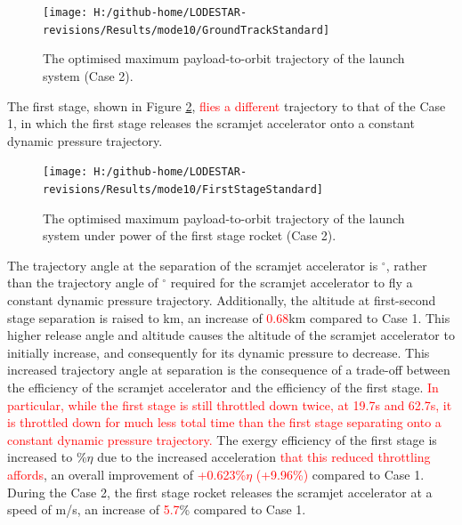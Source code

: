 \begin{figure}[ht!]%
	
	
	
	\centering
	\texttt{[image: H:/github-home/LODESTAR-revisions/Results/mode10/GroundTrackStandard]}
	\caption{The optimised maximum payload-to-orbit trajectory of the launch system (Case 2).}
	\label{fig:GroundTrackStandardNoReturn}
\end{figure}


The first stage, shown in Figure \ref{fig:FirstStageStandardNoReturn}, \textcolor{red}{flies a different} trajectory to that of the Case 1, in which the first stage releases the scramjet accelerator onto a constant dynamic pressure trajectory.
\begin{figure}[ht!]%
	\centering
	\texttt{[image: H:/github-home/LODESTAR-revisions/Results/mode10/FirstStageStandard]}
	\caption{The optimised maximum payload-to-orbit trajectory of the launch system under power of the first stage rocket (Case 2).}
	\label{fig:FirstStageStandardNoReturn}
\end{figure}
 The trajectory angle at the separation of the scramjet accelerator is \secondthirdSeparationgammaqStandardNoReturn$^\circ$, rather than the trajectory angle of \secondthirdSeparationgammaConstqNoReturn$^\circ$ required for the scramjet accelerator to fly a constant dynamic pressure trajectory. Additionally, the altitude at first-second stage separation is raised to \firstsecondSeparationAltStandardNoReturn km, an increase of \textcolor{red}{0.68}km compared to Case 1. This higher release angle and altitude causes the altitude of the scramjet accelerator to initially increase, and consequently for its dynamic pressure to decrease. This increased trajectory angle at separation is the consequence of a trade-off between the efficiency of the scramjet accelerator and the efficiency of the first stage. \textcolor{red}{In particular, while the first stage is still throttled down twice, at 19.7s and 62.7s, it is throttled down for much less total time than the first stage separating onto a constant dynamic pressure trajectory. }
 The exergy efficiency of the first stage is increased to \firstExergyEffStandardNoReturn\%$\eta$ due to the increased acceleration \textcolor{red}{that this reduced throttling affords}, an overall improvement of \textcolor{red}{+0.623\%$\eta$ (+9.96\%)} compared to Case 1. 
 During the Case 2, the first stage rocket releases the scramjet accelerator at a speed of \firstsecondSeparationvStandardNoReturn m/s, an increase of \textcolor{red}{5.7}\% compared to Case 1.



